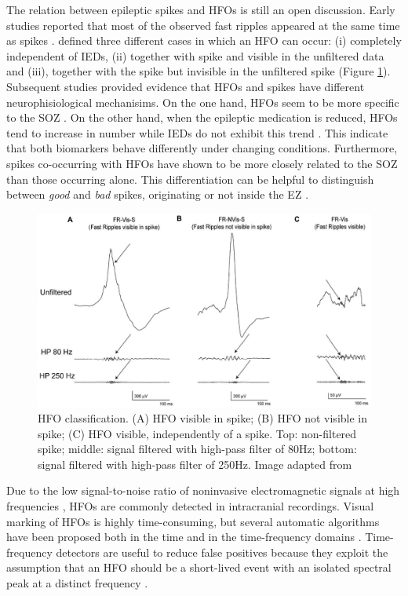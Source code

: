 The relation between epileptic spikes and HFOs is still an open discussion. Early studies reported that most of the observed fast ripples appeared at the same time as spikes \citep{Engel2009}. \citet{Urrestarazu2007} defined three different cases in which an HFO can occur: (i) completely independent of IEDs, (ii) together with spike and visible in the unfiltered data and (iii), together with the spike but invisible in the unfiltered spike (Figure \ref{fig:HfoSpike}). Subsequent studies provided evidence that HFOs and spikes have different neurophisiological mechanisims. On the one hand, HFOs seem to be more specific to the SOZ \citep{Jacobs2008,Crepon2010}. On the other hand, when the epileptic medication is reduced, HFOs tend to increase in number while IEDs do not exhibit this trend \citep{Zijlmans2009}. This indicate that both biomarkers behave differently under changing conditions. Furthermore, spikes co-occurring with HFOs have shown to be more closely related to the SOZ \citep{Jacobs2008} than those occurring alone. This differentiation can be helpful to distinguish between \emph{good} and \emph{bad} spikes, originating or not inside the EZ \citep{Tamilia2017}.   


\begin{figure}[ht]
\centering
\includegraphics[width=1\textwidth]{Images/HFOsWithSpike.jpg}
\caption{HFO classification. (A) HFO visible in spike; (B) HFO not visible in spike; (C) HFO visible, independently of a spike. Top: non-filtered spike; middle: signal filtered with high-pass filter of 80Hz; bottom: signal filtered with high-pass filter of 250Hz. Image adapted from \citep{Urrestarazu2007}}
\label{fig:HfoSpike}
\end{figure}      

Due to the low signal-to-noise ratio of noninvasive electromagnetic signals at high frequencies \citep{Muthukumaraswamy2013}, HFOs are commonly detected in intracranial recordings. Visual marking of HFOs is highly time-consuming, but several automatic algorithms have been proposed both in the time and in the time-frequency domains \citep{Liu2016,Burnos2014,vonEllenrieder2012,Zelmann2012}. Time-frequency detectors are useful to reduce false positives because they exploit the assumption that an HFO should be a short-lived event with an isolated spectral peak at a distinct frequency \citep{Cho2012,Crepon2010}. 

